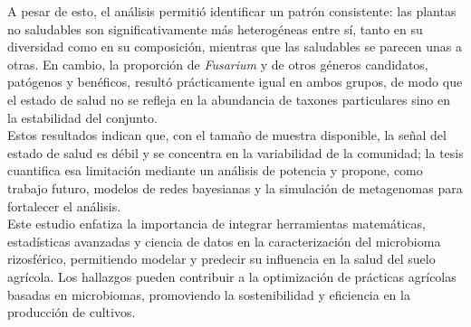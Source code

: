 \documentclass[11pt]{book}
\begin{document}
A pesar de esto, el análisis permitió identificar un patrón consistente: las plantas no saludables son significativamente más heterogéneas entre sí, tanto en su diversidad como en su composición, mientras que las saludables se parecen unas a otras. En cambio, la proporción de \textit{Fusarium} y de otros géneros candidatos, patógenos y benéficos, resultó prácticamente igual en ambos grupos, de modo que el estado de salud no se refleja en la abundancia de taxones particulares sino en la estabilidad del conjunto. \\

Estos resultados indican que, con el tamaño de muestra disponible, la señal del estado de salud es débil y se concentra en la variabilidad de la comunidad; la tesis cuantifica esa limitación mediante un análisis de potencia y propone, como trabajo futuro, modelos de redes bayesianas y la simulación de metagenomas para fortalecer el análisis. \\

Este estudio enfatiza la importancia de integrar herramientas matemáticas, estadísticas avanzadas y ciencia de datos en la caracterización del microbioma rizosférico, permitiendo modelar y predecir su influencia en la salud del suelo agrícola. Los hallazgos pueden contribuir a la optimización de prácticas agrícolas basadas en microbiomas, promoviendo la sostenibilidad y eficiencia en la producción de cultivos. \\

\mainmatter %
\pagestyle{headings}



\thispagestyle{empty}


\thispagestyle{empty}


\thispagestyle{empty}


\thispagestyle{empty}


\thispagestyle{empty}


\thispagestyle{empty}


\end{document}
